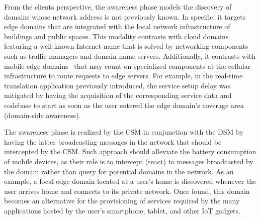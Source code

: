 From the clients perspective, the awareness phase models the discovery of domains whose network address is not previously known. In specific, it targets edge domains that are integrated with the local network infrastructure of buildings and public spaces. This modality contrasts with cloud domains featuring a well-known Internet name that is solved by networking components such as traffic managers and domain-name servers. Additionally, it contrasts with mobile-edge domains~\cite{} that may count on specialized components at the cellular infrastructure to route requests to edge servers. For example, in the real-time translation application previously introduced, the service setup delay was mitigated by having the acquisition of the corresponding service data and codebase to start as soon as the user entered the edge domain's coverage area (domain-side awareness).

The awareness phase is realized by the CSM in conjunction with the DSM by having the latter broadcasting messages in the network that should be intercepted by the CSM. 
Such approach should alleviate the battery consumption of mobile devices, as their role is to intercept (react) to messages broadcasted by the domain rather than query for potential domains in the network. As an example, a local-edge domain located at a user's home is discovered whenever the user arrives home and connects to its private network. Once found, this domain becomes an alternative for the provisioning of services required by the many applications hosted by the user's smartphone, tablet, and other IoT gadgets. %




